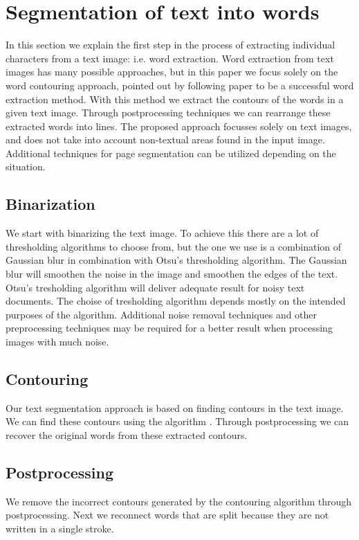 \documentclass{article}
\begin{document}
\section{Segmentation of text into words}
\label{sec:segtext}
In this section we explain the first step in the process of extracting individual characters from a text image: i.e. word extraction.
Word extraction from text images has many possible approaches, but in this paper we focus solely on the word contouring approach, pointed out by following paper \cite{WordSegm} to be a successful word extraction method.
With this method we extract the contours of the words in a given text image. Through postprocessing techniques we can rearrange these extracted words into lines.
The proposed approach focusses solely on text images, and does not take into account non-textual areas found in the input image.
Additional techniques for page segmentation can be utilized depending on the situation.

\subsection{Binarization}
We start with binarizing the text image. To achieve this there are a lot of thresholding algorithms to choose from, but the one we use is a combination of Gaussian blur in combination with Otsu's thresholding algorithm. \cite{Otsu79} 
The Gaussian blur will smoothen the noise in the image and smoothen the edges of the text.
Otsu's tresholding algorithm will deliver adequate result for noisy text documents.
The choise of tresholding algorithm depends mostly on the intended purposes of the algorithm.
Additional noise removal techniques and other preprocessing techniques may be required for a better result when processing images with much noise. 


\subsection{Contouring}
Our text segmentation approach is based on finding contours in the text image.
We can find these contours using the algorithm \cite{Suzuki85}.
Through postprocessing we can recover the original words from these extracted contours.

\subsection{Postprocessing}
We remove the incorrect contours generated by the contouring algorithm through postprocessing.
Next we reconnect words that are split because they are not written in a single stroke.
\end{document}
